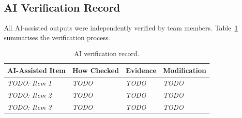 \subsection{AI Verification Record}
\label{sec:ai-verification}

All AI-assisted outputs were independently verified by team members.
Table~\ref{tab:ai-verification} summarises the verification process.

\begin{table}[H]
\centering
\caption{AI verification record.}
\label{tab:ai-verification}
\begin{tabularx}{\textwidth}{l X X l}
\toprule
\textbf{AI-Assisted Item} &
\textbf{How Checked} &
\textbf{Evidence} &
\textbf{Modification} \\
\midrule
%
%
%
\textit{TODO: Item 1} & \textit{TODO} & \textit{TODO} & \textit{TODO} \\[4pt]
\textit{TODO: Item 2} & \textit{TODO} & \textit{TODO} & \textit{TODO} \\[4pt]
\textit{TODO: Item 3} & \textit{TODO} & \textit{TODO} & \textit{TODO} \\
\bottomrule
\end{tabularx}
\end{table}

